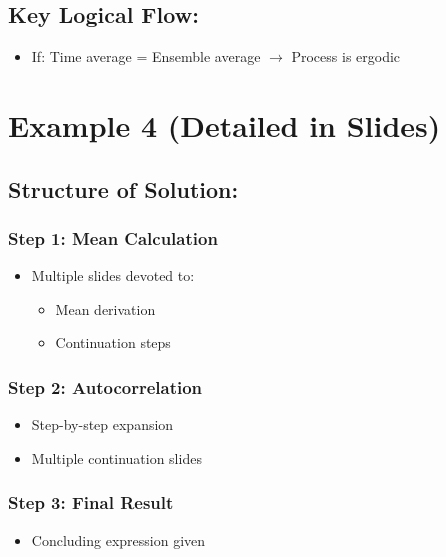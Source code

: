 \documentclass[12pt]{article}
\begin{document}
\subsection{Key Logical Flow:}

\begin{itemize}
    \item If: Time average = Ensemble average
    $\rightarrow$ Process is ergodic
\end{itemize}

\section{Example 4 (Detailed in Slides)}

\subsection*{Structure of Solution:}

\subsubsection*{Step 1: Mean Calculation}

\begin{itemize}
    \item Multiple slides devoted to:
    \begin{itemize}
        \item Mean derivation
        \item Continuation steps
    \end{itemize}
\end{itemize}

\subsubsection*{Step 2: Autocorrelation}

\begin{itemize}
    \item Step-by-step expansion
    \item Multiple continuation slides
\end{itemize}

\subsubsection*{Step 3: Final Result}

\begin{itemize}
    \item Concluding expression given
\end{itemize}
\end{document}
